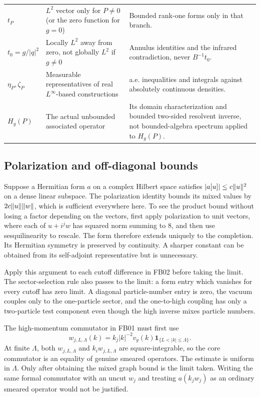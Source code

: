 \documentclass[11pt,a4paper]{article}
\theoremstyle{remark}\newtheorem{remark}[theorem]{Remark}
\newcommand{\abs}[1]{\lvert #1\rvert}\newcommand{\rankone}[2]{\lvert #1\rangle\langle #2\rvert}
\begin{document}
\begin{longtable}{>{\raggedright\arraybackslash}p{}>{\raggedright\arraybackslash}p{}>{\raggedright\arraybackslash}p{}}
$t_P$ & $L^2$ vector only for $P\ne0$ (or the zero function for $g=0$) & Bounded rank-one forms only in that branch.\\
$t_0=g/\abs q^2$ & Locally $L^2$ away from zero, not globally $L^2$ if $g\ne0$ & Annulus identities and the infrared contradiction, never $B^{-1}t_0$.\\
$\eta_P,\zeta_P$ & Measurable representatives of real $L^\infty$-based constructions & a.e. inequalities and integrals against absolutely continuous densities.\\
$H_g(P)$ & The actual unbounded associated operator & Its domain characterization and bounded two-sided resolvent inverse, not bounded-algebra spectrum applied to $H_g(P)$.\\
\bottomrule
\end{longtable}

\subsection{Polarization and off-diagonal bounds}
Suppose a Hermitian form $a$ on a complex Hilbert space satisfies
$\abs{a[u]}\leq c\norm u^2$ on a dense linear subspace. The polarization identity bounds its mixed values by $2c\lVert u\rVert\lVert w\rVert$, which is sufficient everywhere here. To see the product bound without losing a factor depending on the vectors, first apply polarization to unit vectors, where each of $u+i^j w$ has squared norm summing to $8$, and then use sesquilinearity to rescale. The form therefore extends uniquely to the completion. Its Hermitian symmetry is preserved by continuity. A sharper constant can be obtained from its self-adjoint representative but is unnecessary.

Apply this argument to each cutoff difference in FB02 before taking the limit. The sector-selection rule also passes to the limit: a form entry which vanishes for every cutoff has zero limit. A diagonal particle-number entry is zero, the vacuum couples only to the one-particle sector, and the one-to-high coupling has only a two-particle test component even though the high inverse mixes particle numbers.

The high-momentum commutator in FB01 must first use
\[
 w_{j,L,\Lambda}(k)=k_j\abs k^{-2}v_g(k)
             \mathbf1_{\{L<\abs k\leq\Lambda\}}.
\]
At finite $\Lambda$, both $w_{j,L,\Lambda}$ and $k_iw_{j,L,\Lambda}$ are square-integrable, so the core commutator is an equality of genuine smeared operators. The estimate is uniform in $\Lambda$. Only after obtaining the mixed graph bound is the limit taken. Writing the same formal commutator with an uncut $w_j$ and treating $a(k_jw_j)$ as an ordinary smeared operator would not be justified.
\end{document}
